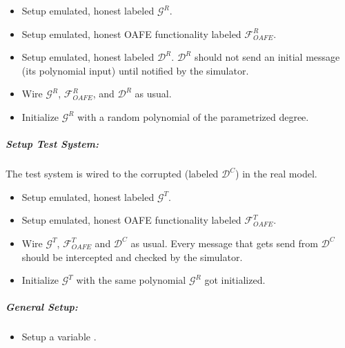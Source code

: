 \begin{itemize}

  \item Setup emulated, honest \JWpOne{} labeled $\mathcal{G}^R$.

  \item Setup emulated, honest OAFE functionality 
    labeled $\mathcal{F}^R_{OAFE}$.

  \item Setup emulated, honest \JWpTwo{} labeled $\mathcal{D}^R$.
    $\mathcal{D}^R$ should not send an initial message (its polynomial input)
    until notified by the simulator.

  \item Wire $\mathcal{G}^R$, $\mathcal{F}^R_{OAFE}$, and $\mathcal{D}^R$ as
    usual.

  \item Initialize $\mathcal{G}^R$ with a random polynomial of the parametrized
    degree.

\end{itemize}


\subparagraph{Setup Test System:}

The test system is wired to the corrupted \JWpTwo{} (labeled $\mathcal{D}^C$) in
the real model.

\begin{itemize}

  \item Setup emulated, honest \JWpOne{} labeled $\mathcal{G}^T$.

  \item Setup emulated, honest OAFE functionality 
    labeled $\mathcal{F}^T_{OAFE}$.

  \item Wire $\mathcal{G}^T$, $\mathcal{F}^T_{OAFE}$ and $\mathcal{D}^C$ as
    usual. Every message that gets send from $\mathcal{D}^C$ should be
    intercepted and checked by the simulator.

  \item Initialize $\mathcal{G}^T$ with the same polynomial $\mathcal{G}^R$ got
    initialized.

\end{itemize}


\subparagraph{General Setup:}

\begin{itemize}

  \item Setup a variable .

\end{itemize}



